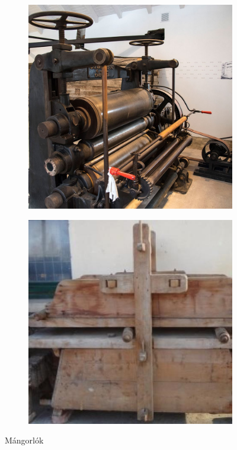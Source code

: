 \begin{figure}[h!]
\begin{subfigure}[b]{0.3\linewidth}
	  \includegraphics[width=\linewidth]{img/20.jpg}
	  \caption{}
	\end{subfigure}
	\begin{subfigure}[b]{0.3\linewidth}
		\includegraphics[width=\linewidth]{img/28613.jpg}
		\caption{}
	  \end{subfigure}
	\caption{Mángorlók}
	\label{fig:mangorlo}
  \end{figure}

